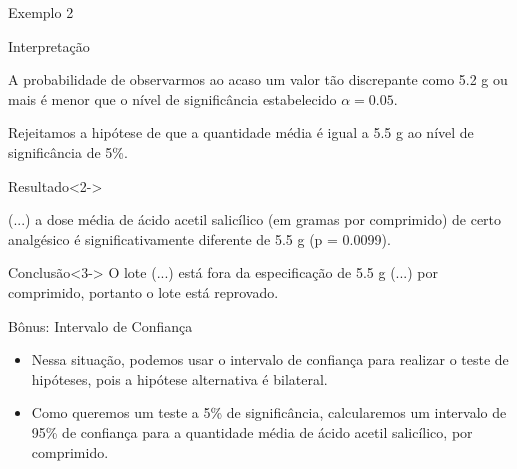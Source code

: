 \documentclass{beamer}
\begin{document}
\begin{frame}{Exemplo 2}
  \begin{block}{Interpretação}
    \scriptsize

    A probabilidade de observarmos ao acaso um valor tão discrepante
    como 5.2 g ou mais é menor que o nível de significância
    estabelecido $\alpha=0.05$.

    \bigskip
    Rejeitamos a hipótese de que a quantidade média é igual a 5.5 g ao
    nível de significância de 5\%.
  \end{block}
  \begin{exampleblock}{Resultado}<2->
    \footnotesize

    (...) a dose média de ácido acetil salicílico (em gramas por
    comprimido) de certo analgésico é significativamente diferente de
    5.5 g (p = 0.0099).
  \end{exampleblock}
  \begin{exampleblock}{Conclusão}<3->
    O lote (...)
    está fora da especificação de 5.5 g (...) por comprimido,
    portanto o lote está reprovado.
  \end{exampleblock}
\end{frame}

\begin{frame}{Bônus: Intervalo de Confiança}
  \begin{itemize}
  \item Nessa situação, podemos usar o intervalo de confiança para
    realizar o teste de hipóteses, pois a hipótese alternativa é
    bilateral.
  \item Como queremos um teste a 5\% de significância, calcularemos um
    intervalo de 95\% de confiança para a quantidade média de ácido
    acetil salicílico, por comprimido.
  \end{itemize}
\end{frame}
\end{document}
